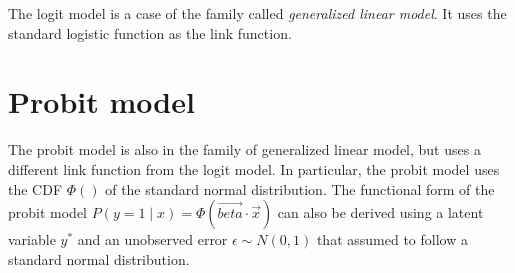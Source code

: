 The logit model is a case of the family called \textit{generalized linear model}. It uses the standard logistic function as the link function. 

\section{Probit model}
The probit model is also in the family of generalized linear model, but uses a different link function from the logit model. In particular, the probit model uses the CDF $\Phi()$ of the standard normal distribution. The functional form of the probit model $P(y=1\mid x)=\Phi(\vec{beta}\cdot \vec{x})$ can also be derived using a latent variable $y^*$ and an unobserved error $\epsilon \sim N(0,1)$ that assumed to follow a standard normal distribution.

